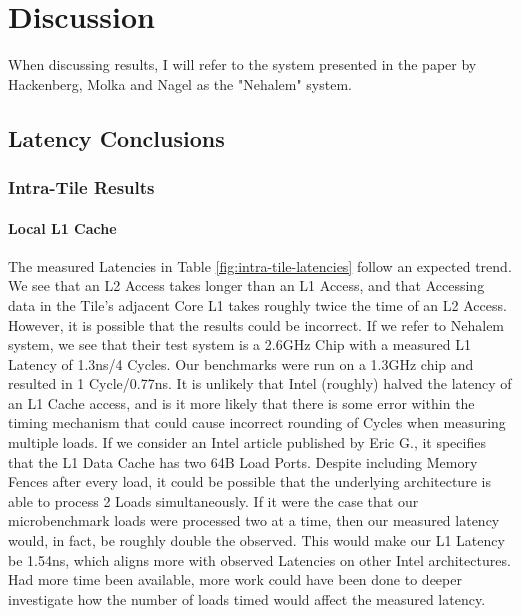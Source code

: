 \documentclass[bsc,frontabs,twoside,singlespacing,parskip,deptreport]{infthesis}     %
\begin{document}
\chapter{Discussion}\label{chap:discussion}
When discussing results, I will refer to the system presented in the paper by Hackenberg, Molka and Nagel\cite{cache-coherence-paper} as the "Nehalem" system.
\section{Latency Conclusions}
\subsection{Intra-Tile Results}
\subsubsection{Local L1 Cache}
The measured Latencies in Table \ref{fig:intra-tile-latencies} follow an expected trend. We see that an L2 Access takes longer than an L1 Access, and that Accessing data in the Tile's adjacent Core L1 takes roughly twice the time of an L2 Access. However, it is possible that the results could be incorrect. If we refer to Nehalem system, we see that their test system is a 2.6GHz Chip with a measured L1 Latency of 1.3ns/4 Cycles. Our benchmarks were run on a 1.3GHz chip and resulted in 1 Cycle/0.77ns. It is unlikely that Intel (roughly) halved the latency of an L1 Cache access, and is it more likely that there is some error within the timing mechanism that could cause incorrect rounding of Cycles when measuring multiple loads. If we consider an Intel article published by Eric G.\cite{eric-intel-article}, it specifies that the L1 Data Cache has two 64B Load Ports. Despite including Memory Fences after every load, it could be possible that the underlying architecture is able to process 2 Loads simultaneously. If it were the case that our microbenchmark loads were processed two at a time, then our measured latency would, in fact, be roughly double the observed. This would make our L1 Latency be 1.54ns, which aligns more with observed Latencies on other Intel architectures. Had more time been available, more work could have been done to deeper investigate how the number of loads timed would affect the measured latency.
\end{document}

